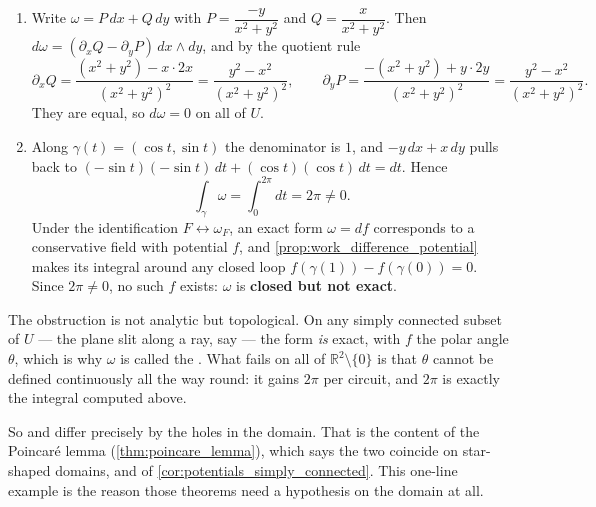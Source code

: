 \begin{exercisesolution}
\label{sol:ai_angle_form_closed}
\begin{enumerate}[label=\textbf{(\alph*)}]
  \item Write $\omega = P\,dx + Q\,dy$ with $P = \dfrac{-y}{x^2+y^2}$ and
    $Q = \dfrac{x}{x^2+y^2}$. Then $d\omega = (\partial_xQ - \partial_yP)\,dx\wedge dy$, and by
    the quotient rule
    \[\partial_xQ = \frac{(x^2+y^2) - x\cdot 2x}{(x^2+y^2)^2} = \frac{y^2-x^2}{(x^2+y^2)^2},
      \qquad
      \partial_yP = \frac{-(x^2+y^2) + y\cdot 2y}{(x^2+y^2)^2} = \frac{y^2-x^2}{(x^2+y^2)^2}.\]
    They are equal, so $d\omega = 0$ on all of $U$.
  \item Along $\gamma(t) = (\cos t,\sin t)$ the denominator is $1$, and
    $-y\,dx + x\,dy$ pulls back to $(-\sin t)(-\sin t)\,dt + (\cos t)(\cos t)\,dt = dt$. Hence
    \[\int_\gamma \omega = \int_0^{2\pi} dt = 2\pi \neq 0.\]
    Under the identification $F \leftrightarrow \omega_F$, an exact form $\omega = df$
    corresponds to a conservative field with potential $f$, and
    \cref{prop:work_difference_potential} makes its integral around any closed loop
    $f(\gamma(1)) - f(\gamma(0)) = 0$. Since $2\pi \neq 0$, no such $f$ exists: $\omega$ is
    \textbf{closed but not exact}.
\end{enumerate}

\begin{remark}
\label{rem:angle_form_hole}
The obstruction is not analytic but topological. On any simply connected subset of $U$ --- the
plane slit along a ray, say --- the form \emph{is} exact, with $f$ the polar angle $\theta$,
which is why $\omega$ is called the . What fails on all of
$\mathbb{R}^2\setminus\{0\}$ is that $\theta$ cannot be defined continuously all the way round:
it gains $2\pi$ per circuit, and $2\pi$ is exactly the integral computed above.

So  and  differ precisely by the holes in the domain. That is the content of
the Poincaré lemma (\cref{thm:poincare_lemma}), which says the two coincide on star-shaped
domains, and of \cref{cor:potentials_simply_connected}. This one-line example is the reason those
theorems need a hypothesis on the domain at all.
\end{remark}
\end{exercisesolution}


